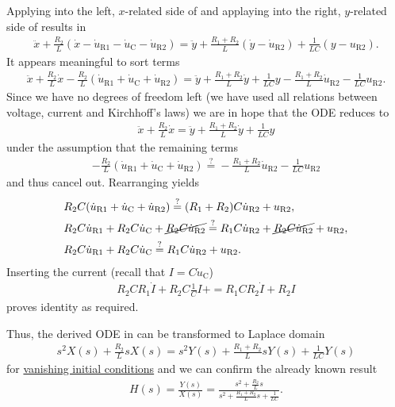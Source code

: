 \documentclass[11pt,a4paper,DIV=12]{scrartcl}
\newcommand\duc{\dot{u}_\mathrm{C}}
\newcommand\duri{\dot{u}_\mathrm{R1}}
\newcommand\urii{u_\mathrm{R2}}
\newcommand\durii{\dot{u}_\mathrm{R2}}
\newcommand\dx{\dot{x}}
\newcommand\ddx{\ddot{x}}
\newcommand\dy{\dot{y}}
\newcommand\ddy{\ddot{y}}
\renewcommand\c{I}
\newcommand\dc{\dot{I}}
\begin{document}
%
Applying  into the left, $x$-related  side of 
and applaying  into the right, $y$-related side of 
results in
%
\begin{align}
\label{eq:ODE_tmp1}
\ddx + \frac{R_2}{L} (\dx - \duri - \duc - \durii) = \ddy + \frac{R_1+R_2}{L} (\dy - \durii) + \frac{1}{L C} (y - \urii).
\end{align}
%
It appears meaningful to sort terms
\begin{align}
\ddx + \frac{R_2}{L} \dx - \frac{R_2}{L} (\duri + \duc + \durii)
=
\ddy + \frac{R_1+R_2}{L} \dy + \frac{1}{L C} y
- \frac{R_1+R_2}{L} \durii - \frac{1}{L C} \urii.
\end{align}
Since we have no degrees of freedom left
(we have used all relations between voltage, current and Kirchhoff's laws)
we are in hope that the ODE reduces to
\begin{align}
\label{eq:ODE}
\boxed{
\ddx + \frac{R_2}{L} \dx
=
\ddy + \frac{R_1+R_2}{L} \dy + \frac{1}{L C} y}
\end{align}
under the assumption that the remaining terms
\begin{align}
- \frac{R_2}{L} (\duri + \duc + \durii)
\stackrel{?}{=}
- \frac{R_1+R_2}{L} \durii - \frac{1}{L C} \urii
\end{align}
and thus cancel out.
%
Rearranging yields
\begin{align}
&R_2 C (\duri + \duc + \durii)
\stackrel{?}{=}
(R_1+R_2) C \durii + \urii,\\
&R_2 C \duri+
R_2 C \duc+
\cancel{R_2 C \durii}
\stackrel{?}{=}
R_1 C \durii + \cancel{R_2 C \durii} + \urii,\\
&R_2 C \duri+
R_2 C \duc
\stackrel{?}{=}
R_1 C \durii+
\urii.
\end{align}
%
Inserting the current (recall that $\c = C \duc$)
\begin{align}
R_2 C R_1 \dc+
R_2 C \frac{1}{C} \c+
=
R_1 C R_2 \dc+
R_2 \c
\end{align}
proves identity as required.

Thus, the derived ODE in  can be transformed to Laplace domain
\begin{align}
s^2 X(s) + \frac{R_2}{L} s X(s)
=
s^2 Y(s) + \frac{R_1+R_2}{L} s Y(s) + \frac{1}{L C} Y(s)
\end{align}
%
for \underline{vanishing initial conditions} and we can confirm the already known result
%
\begin{align}
\boxed{
H(s) = \frac{Y(s)}{X(s)} =
\frac{s^2 + \frac{R_2}{L} s}
{s^2 + \frac{R_1+R_2}{L} s + \frac{1}{L C}}
}.
\end{align}
%
%
\end{document}
